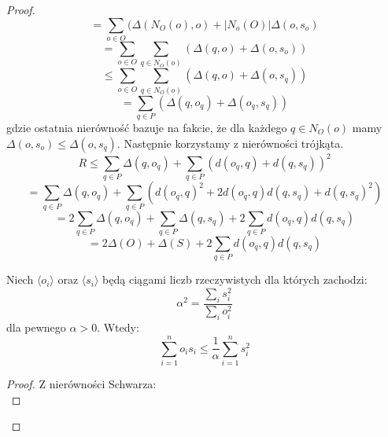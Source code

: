 \begin{proof}
\begin{equation}
        = \sum_{o \in O} (\Delta(N_{O}(o), o) + |N_{o}(O)| \Delta(o, s_{o})
    \end{equation}
    \begin{equation}
        = \sum_{o \in O} \sum_{q \in N_{O}(o)} (\Delta(q, o) + \Delta(o, s_{o}))
    \end{equation}
    \begin{equation}
        \leq \sum_{o \in O} \sum_{q \in N_{O}(o)} (\Delta(q, o) + \Delta(o, s_{q}))
    \end{equation}
    \begin{equation}
        = \sum_{q \in P} (\Delta(q, o_{q}) + \Delta(o_{q}, s_{q}))
    \end{equation}
    gdzie ostatnia nierówność bazuje na fakcie, że dla każdego $q \in N_{O}(o)$ mamy $\Delta(o, s_{o}) \leq \Delta(o, s_{q})$.
    Następnie korzystamy z nierówności trójkąta.
    \begin{equation}
        R \leq  \sum_{q \in P} \Delta(q, o_{q}) + \sum_{q \in P} ( d(o_{q}, q) + d(q, s_{q}))^{2}
    \end{equation}
    \begin{equation}
        = \sum_{q \in P} \Delta(q, o_{q}) + \sum_{q \in P} ( d(o_{q}, q)^{2} + 2d(o_{q}, q)d(q, s_{q}) + d(q, s_{q})^{2})
    \end{equation}
    \begin{equation}
        = 2\sum_{q \in P} \Delta(q, o_{q}) + \sum_{q \in P} \Delta(q, s_{q}) + 2\sum_{q \in P} d(o_{q}, q)d(q, s_{q})
    \end{equation}
    \begin{equation}
        = 2\Delta(O) + \Delta(S) + 2\sum_{q \in P} d(o_{q}, q)d(q, s_{q})
    \end{equation}
    \begin{lemma}
        Niech $\langle o_{i} \rangle$ oraz $\langle s_{i} \rangle$ będą ciągami liczb rzeczywistych dla których zachodzi:
        \begin{equation}
            \alpha^2 = \frac{\sum_{i} s_{i}^{2}}{\sum_{i} o_{i}^{2}}
        \end{equation}
        dla pewnego $\alpha > 0$.
        Wtedy:
        \begin{equation}
            \sum_{i=1}^{n} o_{i} s_{i} \leq \frac{1}{\alpha} \sum_{i=1}^{n} s_{i}^{2}
        \end{equation}
    \end{lemma}
    \begin{proof}
        Z nierówności Schwarza:
        \begin{equation}

\end{equation}
\end{proof}
\end{proof}
